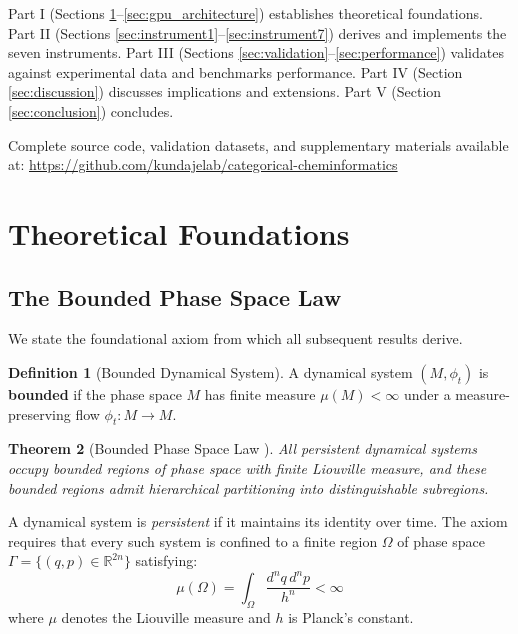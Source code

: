 \documentclass[11pt,a4paper]{article}
\newtheorem{theorem}{Theorem}[section]
\theoremstyle{definition}
\newtheorem{definition}[theorem]{Definition}
\theoremstyle{remark}
\begin{document}
Part I (Sections \ref{sec:foundations}--\ref{sec:gpu_architecture}) establishes theoretical foundations. Part II (Sections \ref{sec:instrument1}--\ref{sec:instrument7}) derives and implements the seven instruments. Part III (Sections \ref{sec:validation}--\ref{sec:performance}) validates against experimental data and benchmarks performance. Part IV (Section \ref{sec:discussion}) discusses implications and extensions. Part V (Section \ref{sec:conclusion}) concludes.

Complete source code, validation datasets, and supplementary materials available at: \url{https://github.com/kundajelab/categorical-cheminformatics}

\section{Theoretical Foundations}
\label{sec:foundations}

\subsection{The Bounded Phase Space Law}

We state the foundational axiom from which all subsequent results derive.

\begin{definition}[Bounded Dynamical System]
A dynamical system $(M, \phi_t)$ is \textbf{bounded} if the phase space $M$ has finite measure $\mu(M) < \infty$ under a measure-preserving flow $\phi_t : M \to M$.
\end{definition}

\begin{theorem}[Bounded Phase Space Law \cite{sachikonye2025bounded}]
\label{thm:bounded_phase_space}
All persistent dynamical systems occupy bounded regions of phase space with finite Liouville measure, and these bounded regions admit hierarchical partitioning into distinguishable subregions.
\end{theorem}

A dynamical system is \textit{persistent} if it maintains its identity over time. The axiom requires that every such system is confined to a finite region $\Omega$ of phase space $\Gamma = \{(q,p) \in \mathbb{R}^{2n}\}$ satisfying:
\begin{equation}
\mu(\Omega) = \int_\Omega \frac{d^n q \, d^n p}{h^n} < \infty
\end{equation}
where $\mu$ denotes the Liouville measure and $h$ is Planck's constant.
\end{document}
